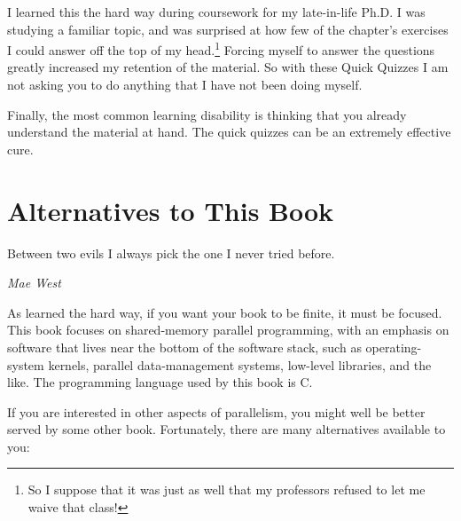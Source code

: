 I learned this the hard way during coursework for my late-in-life
Ph.D.
I was studying a familiar topic, and was surprised at how few of
the chapter's exercises I could answer off the top of my head.\footnote{
	So I suppose that it was just as well that my professors refused
	to let me waive that class!}
Forcing myself to answer the questions greatly increased my
retention of the material.
So with these Quick Quizzes I am not asking you to do anything
that I have not been doing myself.

Finally, the most common learning disability is thinking that
you already understand the material at hand.
The quick quizzes can be an extremely effective cure.

\section{Alternatives to This Book}
\label{sec:Alternatives to This Book}
%
\epigraph{Between two evils I always pick the one I never tried before.}
	 {\emph{Mae West}}

As  learned the hard way, if you want your book
to be finite, it must be focused.
This book focuses on shared-memory parallel programming, with an
emphasis on software that lives near the bottom of the software stack,
such as operating-system kernels, parallel data-management systems,
low-level libraries, and the like.
The programming language used by this book is C.

If you are interested in other aspects of parallelism, you might well
be better served by some other book.
Fortunately, there are many alternatives available to you:

